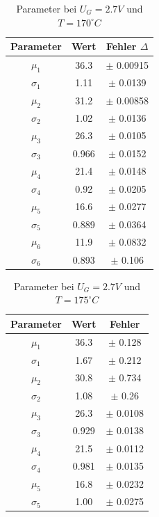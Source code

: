 \documentclass{article}
\begin{document}
\begin{multicols}{2}
\begin{table}[H]
  \centering
  \begin{tabular}{|c|c|c|}
      \hline
      Parameter & Wert & Fehler $\Delta$ \\ \hline
      $\mu_1$ & 36.3 & $\pm$ 0.00915 \\ \hline
      $\sigma_1$ & 1.11 & $\pm$ 0.0139 \\ \hline
      $\mu_2$ & 31.2 & $\pm$ 0.00858 \\ \hline
      $\sigma_2$ & 1.02 & $\pm$ 0.0136 \\ \hline
      $\mu_3$ & 26.3 & $\pm$ 0.0105 \\ \hline
      $\sigma_3$ & 0.966 & $\pm$ 0.0152 \\ \hline
      $\mu_4$ & 21.4 & $\pm$ 0.0148 \\ \hline
      $\sigma_4$ & 0.92 & $\pm$ 0.0205 \\ \hline
      $\mu_5$ & 16.6 & $\pm$ 0.0277 \\ \hline
      $\sigma_5$ & 0.889 & $\pm$ 0.0364 \\ \hline
      $\mu_6$ & 11.9 & $\pm$ 0.0832 \\ \hline
      $\sigma_6$ & 0.893 & $\pm$ 0.106 \\ \hline
  \end{tabular}
  \caption{Parameter bei $U_G=2.7V$ und $T=170^\circ C$}
  \label{tab:data_no_height_6}
\end{table}

\begin{table}[H]
  \centering
  \begin{tabular}{|c|c|c|}
      \hline
      Parameter & Wert & Fehler  \\ \hline
      $\mu_1$ & 36.3 & $\pm$ 0.128 \\ \hline
      $\sigma_1$ & 1.67 & $\pm$ 0.212 \\ \hline
      $\mu_2$ & 30.8 & $\pm$ 0.734 \\ \hline
      $\sigma_2$ & 1.08 & $\pm$ 0.26 \\ \hline
      $\mu_3$ & 26.3 & $\pm$ 0.0108 \\ \hline
      $\sigma_3$ & 0.929 & $\pm$ 0.0138 \\ \hline
      $\mu_4$ & 21.5 & $\pm$ 0.0112 \\ \hline
      $\sigma_4$ & 0.981 & $\pm$ 0.0135 \\ \hline
      $\mu_5$ & 16.8 & $\pm$ 0.0232 \\ \hline
      $\sigma_5$ & 1.00 & $\pm$ 0.0275 \\ \hline
  \end{tabular}
  \caption{Parameter bei $U_G=2.7V$ und $T=175^\circ C$}
  \label{tab:data_no_height_7}
\end{table}


\end{multicols}
\end{document}
